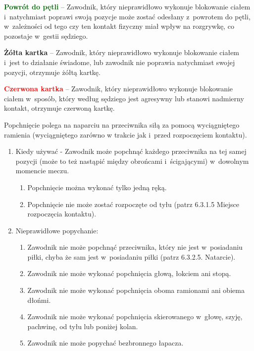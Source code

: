 \documentclass[12pt,a4paper]{article}
\renewcommand{\paragraph}[1]{
  \oldparagraph{#1}%
  \leftskip2cm
}
\newcommand\redcard[1]{\bgroup\textcolor{red}{\textbf{#1}}}
\newcommand\yellowcard[1]{\bgroup\textcolor{darkyellow}{\textbf{#1}}}
\newcommand\other[1]{\bgroup\textcolor{darkgreen}{\textbf{#1}}}
\begin{document}
\other{Powrót do pętli} -- Zawodnik, który nieprawidłowo wykonuje
blokowanie ciałem i~natychmiast poprawi swoją pozycje może zostać
odesłany z~powrotem do pętli, w~zależności od tego czy ten kontakt
fizyczny miał wpływ na rozgrywkę, co pozostaje w~gestii sędziego.

\yellowcard{Żółta kartka} -- Zawodnik, który nieprawidłowo wykonuje blokowanie
ciałem i~jest to działanie świadome, lub zawodnik nie poprawia
natychmiast swojej pozycji, otrzymuje żółtą kartkę.

\redcard{Czerwona kartka} -- Zawodnik, który nieprawidłowo wykonuje
blokowanie ciałem w~sposób, który według sędziego jest agresywny lub
stanowi nadmierny kontakt, otrzymuje czerwoną kartkę.

\paragraph{Popychanie}
Popchnięcie polega na naparciu na
przeciwnika siłą za pomocą wyciągniętego ramienia (wyciągniętego zarówno
w trakcie jak i~przed rozpoczęciem kontaktu).

\begin{enumerate}
	\item
	      Kiedy używać - Zawodnik może popchnąć każdego przeciwnika na tej samej
	      pozycji (może to też nastąpić między obrońcami i~ścigającymi) w~dowolnym momencie meczu.

	      \begin{enumerate}
		      \item
		            Popchnięcie można wykonać tylko jedną ręką.
		      \item
		            Popchnięcie nie może zostać rozpoczęte od tyłu (patrz 6.3.1.5
		            Miejsce rozpoczęcia kontaktu).
	      \end{enumerate}
	\item
	      Nieprawidłowe popychanie:

	      \begin{enumerate}
		      \item
		            Zawodnik nie może popchnąć przeciwnika, który nie jest w~posiadaniu
		            piłki, chyba że sam jest w~posiadaniu piłki (patrz 6.3.2.5.
		            Natarcie).
		      \item
		            Zawodnik nie może wykonać popchnięcia głową, łokciem ani stopą.
		      \item
		            Zawodnik nie może wykonać popchnięcia oboma ramionami ani obiema
		            dłońmi.
		      \item
		            Zawodnik nie może wykonać popchnięcia skierowanego w~głowę, szyję,
		            pachwinę, od tyłu lub poniżej kolan.
		      \item
		            Zawodnik nie może popychać bezbronnego łapacza.
	      \end{enumerate}
\end{enumerate}
\end{document}
